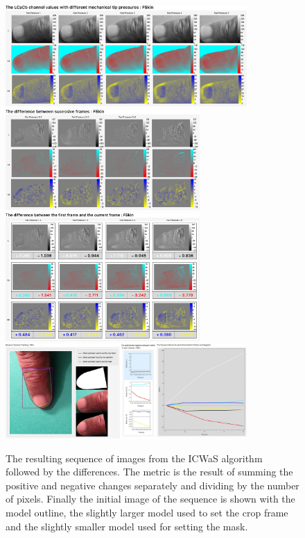 \begin{figure}[h!]
  \centering
    \includegraphics[width=0.820\textwidth]{Chapter4/Figs/Final_Fig_Channels_FSkin.jpg}
    \includegraphics[width=0.660\textwidth]{Chapter4/Figs/Final_Fig_Difference_FSkin.jpg}
    \includegraphics[width=0.660\textwidth]{Chapter4/Figs/Final_Fig_Total_Difference_FSkin.jpg}
    \includegraphics[width=0.820\textwidth]{Chapter4/Figs/Final_Fig_Misc_FSkin.jpg}
        \caption{The resulting sequence of images from the ICWaS algorithm followed by the differences. The metric is the result of summing the positive and negative changes separately and dividing by the number of pixels. Finally the initial image of the sequence is shown with the model outline, the slightly larger model used to set the crop frame and the slightly smaller model used for setting the mask.}\label{fig:ICWaSResultFSkin}
\end{figure}


